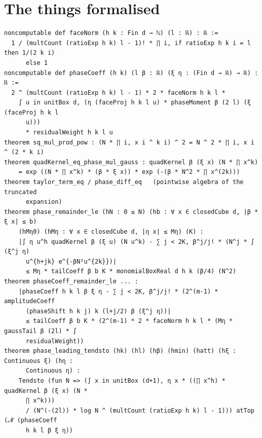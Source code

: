 \documentclass[11pt]{article}
\begin{document}
\section{The things formalised}
{\small
\begin{verbatim}
noncomputable def faceNorm (h k : Fin d → ℕ) (l : ℝ) : ℝ :=
  1 / (multCount (ratioExp h k) l - 1)! * ∏ i, if ratioExp h k i = l then 1/(2 k i)
      else 1
noncomputable def phaseCoeff (h k) (l β : ℝ) (ξ η : (Fin d → ℝ) → ℝ) : ℝ :=
  2 ^ (multCount (ratioExp h k) l - 1) * 2 * faceNorm h k l *
    ∫ u in unitBox d, (η (faceProj h k l u) * phaseMoment β (2 l) (ξ (faceProj h k l
      u)))
      * residualWeight h k l u
theorem sq_mul_prod_pow : (N * ∏ i, x i ^ k i) ^ 2 = N ^ 2 * ∏ i, x i ^ (2 * k i)
theorem quadKernel_eq_phase_mul_gauss : quadKernel β (ξ x) (N * ∏ x^k)
    = exp ((N * ∏ x^k) * (β * ξ x)) * exp (-(β * N^2 * ∏ x^(2k)))
theorem taylor_term_eq / phase_diff_eq   (pointwise algebra of the truncated
      expansion)
theorem phase_remainder_le (hN : 0 ≤ N) (hb : ∀ x ∈ closedCube d, |β * ξ x| ≤ b)
    (hMη0) (hMη : ∀ x ∈ closedCube d, |η x| ≤ Mη) (K) :
    |∫ η u^h quadKernel β (ξ u) (N u^k) - ∑ j < 2K, β^j/j! * (N^j * ∫ (ξ^j η)
      u^{h+jk} e^{-βN²u^{2k}})|
      ≤ Mη * tailCoeff β b K * monomialBoxReal d h k (β/4) (N^2)
theorem phaseCoeff_remainder_le ... :
    |phaseCoeff h k l β ξ η - ∑ j < 2K, β^j/j! * (2^(m-1) * amplitudeCoeff
      (phaseShift h k j) k (l+j/2) β (ξ^j η))|
      ≤ tailCoeff β b K * (2^(m-1) * 2 * faceNorm h k l * (Mη * gaussTail β (2l) * ∫
      residualWeight))
theorem phase_leading_tendsto (hk) (hl) (hβ) (hmin) (hatt) (hξ : Continuous ξ) (hη :
      Continuous η) :
    Tendsto (fun N => (∫ x in unitBox (d+1), η x * ((∏ x^h) * quadKernel β (ξ x) (N *
      ∏ x^k)))
      / (N^(-(2l)) * log N ^ (multCount (ratioExp h k) l - 1))) atTop (𝓝 (phaseCoeff
      h k l β ξ η))
\end{verbatim}
}
\end{document}
